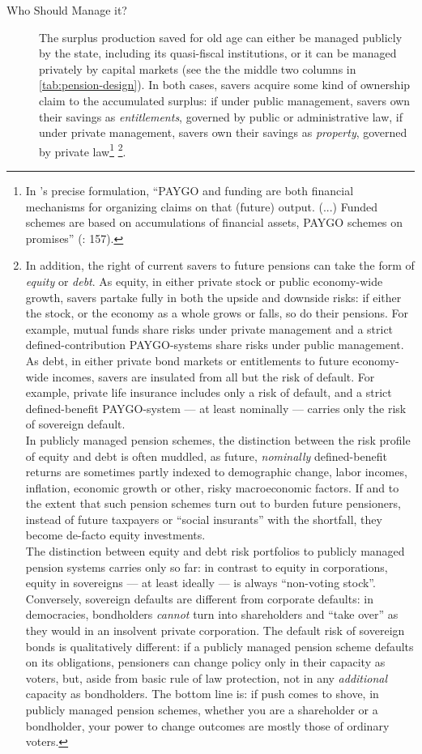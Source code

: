 \begin{description}
	\item[Who Should Manage it?] The surplus production saved for old age can either be managed publicly by the state, including its quasi-fiscal institutions, or it can be managed privately by capital markets (see the the middle two columns in \autoref{tab:pension-design}). In both cases, savers acquire some kind of ownership claim to the accumulated surplus: if under public management, savers own their savings as \emph{entitlements}, governed by public or administrative law, if under private management, savers own their savings as \emph{property}, governed by private law\footnote{
		In \citeauthor{Barr2005a}'s precise formulation, ``PAYGO and funding are both financial mechanisms for organizing claims on that (future) output. (...) Funded schemes are based on accumulations of financial assets, PAYGO schemes on promises'' (\citeyear{Barr2005a}: 157).} \footnote{
		In addition, the right of current savers to future pensions can take the form of \emph{equity} or \emph{debt}. As equity, in either private stock or public economy-wide growth, savers partake fully in both the upside and downside risks: if either the stock, or the economy as a whole grows or falls, so do their pensions. For example, mutual funds share risks under private management and a strict defined-contribution PAYGO-systems share risks under public management. As debt, in either private bond markets or entitlements to future economy-wide incomes, savers are insulated from all but the risk of default. For example, private life insurance includes only a risk of default, and a strict defined-benefit PAYGO-system --- at least nominally --- carries only the risk of sovereign default. \\
		In publicly managed pension schemes, the distinction between the risk profile of equity and debt is often muddled, as future, \emph{nominally} defined-benefit returns are sometimes partly indexed to demographic change, labor incomes, inflation, economic growth or other, risky macroeconomic factors. If and to the extent that such pension schemes turn out to burden future pensioners, instead of future taxpayers or ``social insurants'' with the shortfall, they become de-facto equity investments. \\
		The distinction between equity and debt risk portfolios to publicly managed pension systems carries only so far: in contrast to equity in corporations, equity in sovereigns --- at least ideally --- is always ``non-voting stock''. Conversely, sovereign defaults are different from corporate defaults: in democracies, bondholders \emph{cannot} turn into shareholders and ``take over'' as they would in an insolvent private corporation. The default risk of sovereign bonds is qualitatively different: if a publicly managed pension scheme defaults on its obligations, pensioners can change policy only in their capacity as voters, but, aside from basic rule of law protection, not in any \emph{additional} capacity as bondholders. The bottom line is: if push comes to shove, in publicly managed pension schemes, whether you are a shareholder or a bondholder, your power to change outcomes are mostly those of ordinary voters.}.

\end{description}
